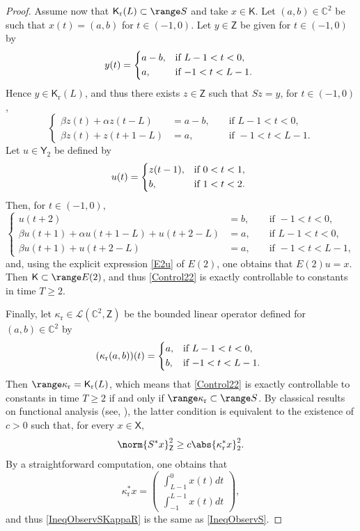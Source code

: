 \begin{proof}
Assume now that $\mathsf K_{\mathrm r}(L) \subset \range S$ and take $x \in \mathsf K$. Let $(a, b) \in \mathbb C^2$ be such that $x(t) = (a, b)$ for $t \in (-1, 0)$. Let $y \in \mathsf Z$ be given for $t \in (-1, 0)$ by
\[
y(t) = \begin{dcases*}
a - b, & if $L - 1 < t < 0$, \\
a, & if $-1 < t < L - 1$.
\end{dcases*}
\]
Hence $y \in \mathsf K_{\mathrm r}(L)$, and thus there exists $z \in \mathsf Z$ such that $S z = y$, \ie for $t \in (-1, 0)$,
\[
\left\{
\begin{aligned}
\beta z(t) + \alpha z(t - L) & = a - b, & & \text{ if } L - 1 < t < 0, \\
\beta z(t) + z(t + 1 - L) & = a, & & \text{ if } -1 < t < L - 1.
\end{aligned}
\right.
\]
Let $u \in \mathsf Y_2$ be defined by
\[
u(t) =
\begin{dcases*}
z(t - 1), & if $0 < t < 1$, \\
b, & if $1 < t < 2$.
\end{dcases*}
\]
Then, for $t \in (-1, 0)$,
\[
\left\{
\begin{aligned}
u(t + 2) & = b, & & \text{ if } -1 < t < 0, \\
\beta u(t + 1) + \alpha u(t + 1 - L) + u(t + 2 - L) & = a, & & \text{ if } L - 1 < t < 0, \\
\beta u(t + 1) + u(t + 2 - L) & = a, & & \text{ if } -1 < t < L - 1,
\end{aligned}
\right.
\]
and, using the explicit expression \eqref{E2u} of $E(2)$, one obtains that $E(2) u = x$. Then $\mathsf K \subset \range E(2)$, and thus \eqref{Control22} is exactly controllable to constants in time $T \geq 2$.

Finally, let $\kappa_{\mathrm r} \in \mathcal L(\mathbb C^2, \mathsf Z)$ be the bounded linear operator defined for $(a, b) \in \mathbb C^2$ by
\[
(\kappa_{\mathrm r} (a, b)) (t) =
\begin{dcases*}
a, & if $L - 1 < t < 0$, \\
b, & if $-1 < t < L - 1$.
\end{dcases*}
\]
Then $\range \kappa_{\mathrm r} = \mathsf K_{\mathrm r}(L)$, which means that \eqref{Control22} is exactly controllable to constants in time $T \geq 2$ if and only if $\range \kappa_{\mathrm r} \subset \range S$. By classical results on functional analysis (see, \eg \cite[Lem.\,2.48]{Coron2007Control}), the latter condition is equivalent to the existence of $c > 0$ such that, for every $x \in \mathsf X$,
\begin{equation}
\label{IneqObservSKappaR}
\norm{S^\ast x}_{\mathsf Z}^2 \geq c \abs{\kappa_{\mathrm r}^\ast x}_2^2.
\end{equation}
By a straightforward computation, one obtains that
\[
\kappa_{\mathrm r}^\ast x =
\left(
\begin{aligned}
\textstyle\int_{L-1}^0 x(t) dt \\
\textstyle\int_{-1}^{L-1} x(t) dt
\end{aligned}
\right),
\]
and thus \eqref{IneqObservSKappaR} is the same as \eqref{IneqObservS}.
\end{proof}


